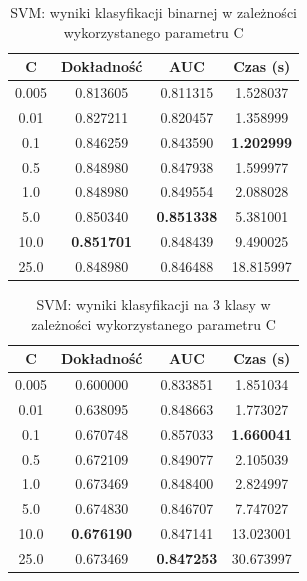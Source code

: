 \documentclass[a4paper, twoside, 11pt, openright]{article}
\begin{document}
\begin{table}[H]
    \centering
    \begin{tabular}{|c|c|c|c|}
    \hline
        \textbf{C} & \textbf{Dokładność} & \textbf{AUC} & \textbf{Czas (s)} \\ \hline
0.005 &  0.813605 &  0.811315 &    1.528037 \\ \hline
0.01  &  0.827211 &  0.820457 &    1.358999 \\ \hline
0.1   &  0.846259 &  0.843590 &    \textbf{1.202999} \\ \hline
0.5   &  0.848980 &  0.847938 &    1.599977 \\ \hline
1.0   &  0.848980 &  0.849554 &    2.088028 \\ \hline
5.0   &  0.850340 &  \textbf{0.851338} &    5.381001 \\ \hline
10.0  &  \textbf{0.851701} &  0.848439 &    9.490025 \\ \hline
25.0  &  0.848980 &  0.846488 &   18.815997 \\ \hline
    \end{tabular}
    \caption{SVM: wyniki klasyfikacji binarnej w zależności wykorzystanego parametru C}
    \label{tab:svm_c_binary}
\end{table}


\begin{table}[H]
    \centering
    \begin{tabular}{|c|c|c|c|}
    \hline
        \textbf{C} & \textbf{Dokładność} & \textbf{AUC} & \textbf{Czas (s)} \\ \hline
0.005 &  0.600000 &  0.833851 &    1.851034 \\ \hline
0.01  &  0.638095 &  0.848663 &    1.773027 \\ \hline
0.1   &  0.670748 &  0.857033 &    \textbf{1.660041} \\ \hline
0.5   &  0.672109 &  0.849077 &    2.105039 \\ \hline
1.0   &  0.673469 &  0.848400 &    2.824997 \\ \hline
5.0   &  0.674830 &  0.846707 &    7.747027 \\ \hline
10.0  &  \textbf{0.676190} &  0.847141 &   13.023001 \\ \hline
25.0  &  0.673469 &  \textbf{0.847253} &   30.673997 \\ \hline
    \end{tabular}
    \caption{SVM: wyniki klasyfikacji na 3 klasy w zależności wykorzystanego parametru C}
    \label{tab:svm_c_discrete}
\end{table}
\end{document}
